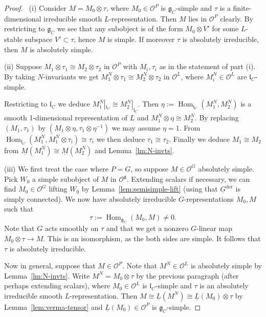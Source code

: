 \documentclass[a4paper]{amsart}
\numberwithin{equation}{section}
\theoremstyle{remark}
\theoremstyle{definition}
\DeclareMathOperator{\Hom}{Hom}
\newcommand{\alggrp}[1]{\underline{#1}}
\newcommand{\der}{\mathrm{der}}
\renewcommand{\simeq}{\cong}
\begin{document}
\begin{proof}\
  (i) Consider $M = M_0 \otimes \tau$, where $M_0 \in \mathcal{O}^{P}$ is $\mathfrak{g}_{C}$-simple and $\tau$ is a finite-dimensional irreducible smooth $L$-representation.
  Then $M$ lies in $\mathcal{O}^{P}$ clearly. By restricting to $\mathfrak{g}_{C}$ we see that any subobject is of the form $M_0 \otimes V'$ for some $L$-stable subspace 
  $V' \subset \tau$, hence $M$ is simple. If moreover $\tau$ is absolutely irreducible, then $M$ is absolutely simple.

  (ii) Suppose $M_1 \otimes \tau_1 \cong M_2 \otimes \tau_2$ in $\mathcal{O}^{P}$ with $M_i, \tau_i$ as in the statement of part (i). 
  By taking $N$-invariants we get $M_1^N \otimes \tau_1 \cong M_2^N \otimes \tau_2$ in $\mathcal{O}^{L}$, where $M_i^N \in \mathcal{O}^{L}$ are $\mathfrak{l}_{C}$-simple.

  Restricting to $\mathfrak{l}_{C}$ we deduce $M_1^N|_{\mathfrak{l}_{C}} \cong M_2^N|_{\mathfrak{l}_{C}}$. 
  Then $\eta := \Hom_{\mathfrak{l}_{C}}(M_1^N,M_2^N)$ is a smooth 1-dimensional representation of $L$ and $M_1^N \otimes \eta \cong M_2^N$.
  By replacing $(M_1,\tau_1)$ by $(M_1 \otimes \eta,\tau_1 \otimes \eta^{-1})$
  we may assume $\eta = 1$. From $\Hom_{\mathfrak{l}_{C}}(M_1^N, M_1^N \otimes \tau_i) \cong \tau_i$ we then deduce $\tau_1 \cong \tau_2$.
  Finally we deduce $M_1 \cong M_2$ from 
  $\underline{M}(M_{1}^{N})\simeq \underline{M}(M_{2}^{N})$ and Lemma~\ref{lm:N-invts}.

  (iii) We first treat the case where $P = G$, so suppose $M \in \mathcal{O}^{G}$ absolutely simple. 
  Pick $W_0$ a simple subobject of $M$ in $\mathcal{O}^{\mathfrak{g}}$.
  Extending scalars if necessary, we can find $M_0 \in \mathcal{O}^{G}$ lifting $W_0$ by Lemma~\ref{lem:semisimple-lift} (using that $\alggrp{G}^{\der}$ is simply connected).
  We now have absolutely irreducible $G$-representations $M_0, M$ such that
  \begin{equation*}
    \tau := \Hom_{\mathfrak{g}_{C}}(M_0, M) \ne 0.
  \end{equation*}
  Note that $G$ acts smoothly on $\tau$ and that we get a nonzero $G$-linear map $M_0 \otimes \tau \to M$. This is an isomorphism,
  as the both sides are simple. It follows that $\tau$ is absolutely irreducible.

  Now in general, suppose that $M \in \mathcal{O}^{P}$.
  Note that $M^N \in \mathcal{O}^{L}$ is absolutely simple by Lemma~\ref{lm:N-invts}. Write $M^{N} = M_0 \otimes \tau$ by the previous paragraph (after perhaps extending scalars), 
  where $M_0 \in \mathcal{O}^{L}$ is $\mathfrak{l}_{C}$-simple and 
  $\tau$ is an absolutely irreducible smooth $L$-representation.
  Then $M \simeq \underline{L}(M^{N})\simeq \underline{L}(M_{0})\otimes \tau$ by Lemma~\ref{lem:verma-tensor} and $\underline{L}(M_{0})\in \mathcal{O}^{P}$ is $\mathfrak{g}_{C}$-simple.
\end{proof}
\end{document}
